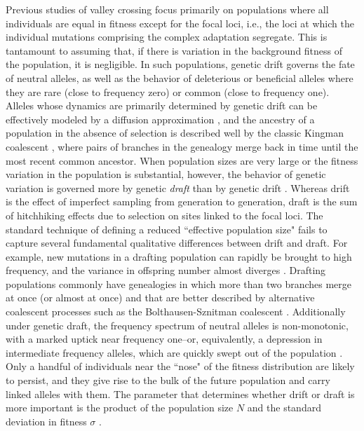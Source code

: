 \documentclass[10pt,twocolumn,twoside]{gsajnl}
\begin{document}
\begin{spacing}{1.5}
Previous studies of valley crossing focus primarily on populations where all individuals are equal in fitness except for the focal loci, i.e., the loci at which the individual mutations comprising the complex adaptation segregate.
This is tantamount to assuming that, if there is variation in the background fitness of the population, it is negligible.
In such populations, genetic drift governs the fate of neutral alleles, as well as the behavior of deleterious or beneficial alleles where they are rare (close to frequency zero) or common (close to frequency one).
Alleles whose dynamics are primarily determined by genetic drift can be effectively modeled by a diffusion approximation \citep{Wright:1945,Kimura:1955,Kimura:1957}, and the ancestry of a population in the absence of selection is described well by the classic Kingman coalescent \citep{Kingman:1982}, where pairs of branches in the genealogy merge back in time until the most recent common ancestor.
When population sizes are very large or the fitness variation in the population is substantial, however, the behavior of genetic variation is governed more by genetic \emph{draft} than by genetic drift \citep{gillespie_2000, gillespie_2001, masel_2011, neher_shraiman_2011}.
Whereas drift is the effect of imperfect sampling from generation to generation, draft is the sum of hitchhiking effects due to selection on sites linked to the focal loci.
The standard technique of defining a reduced ``effective population size" fails to capture several fundamental qualitative differences between drift and draft.
For example, new mutations in a drafting population can rapidly be brought to high frequency, and the variance in offspring number almost diverges \citep{neher_shraiman_2011}.
Drafting populations commonly have genealogies in which more than two branches merge at once (or almost at once) and that are better described by alternative coalescent processes such as the Bolthausen-Sznitman coalescent \citep{neher_hallatschek_2013, brunet_2007, schweinsberg_2017}.
Additionally under genetic draft, the frequency spectrum of neutral alleles is non-monotonic, with a marked uptick near frequency one--or, equivalently, a depression in intermediate frequency alleles, which are quickly swept out of the population \citep{neher_shraiman_2011,kosheleva_2013,neher_hallatschek_2013}.
Only a handful of individuals near the ``nose" of the fitness distribution are likely to persist, and they give rise to the bulk of the future population and carry linked alleles with them.
The parameter that determines whether drift or draft is more important is the product of the population size $N$ and the standard deviation in fitness $\sigma$ \citep{neher_hallatschek_2013}.


\end{spacing}
\end{document}

